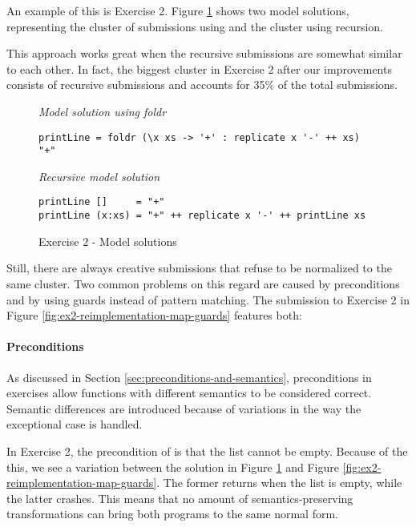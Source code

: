 An example of this is Exercise 2. Figure \ref{fig:ex2-model-solutions} shows two model solutions, representing the cluster of submissions using  and the cluster using recursion.

This approach works great when the recursive submissions are somewhat similar to each other. In fact, the biggest cluster in Exercise 2 after our improvements consists of recursive submissions and accounts for 35\% of the total submissions.

\begin{figure}
\centering
\emph{Model solution using foldr}
\begin{verbatim}
printLine = foldr (\x xs -> '+' : replicate x '-' ++ xs) "+"
\end{verbatim}
\bigskip
\emph{Recursive model solution}
\begin{verbatim}
printLine []     = "+"
printLine (x:xs) = "+" ++ replicate x '-' ++ printLine xs
\end{verbatim}
\caption{Exercise 2 - Model solutions}
\label{fig:ex2-model-solutions}
\end{figure}

Still, there are always creative submissions that refuse to be normalized to the same cluster. Two common problems on this regard are caused by preconditions and by using guards instead of pattern matching. The submission to Exercise 2 in Figure \ref{fig:ex2-reimplementation-map-guards} features both:

\paragraph{Preconditions}

As discussed in Section \ref{sec:preconditions-and-semantics}, preconditions in exercises allow functions with different semantics to be considered correct. Semantic differences are introduced because of variations in the way the exceptional case is handled.

In Exercise 2, the precondition of  is that the list cannot be empty. Because of the this, we see a variation between the solution in Figure \ref{fig:ex2-model-solutions} and Figure \ref{fig:ex2-reimplementation-map-guards}. The former returns  when the list is empty, while the latter crashes. This means that no amount of semantics-preserving transformations can bring both programs to the same normal form.


